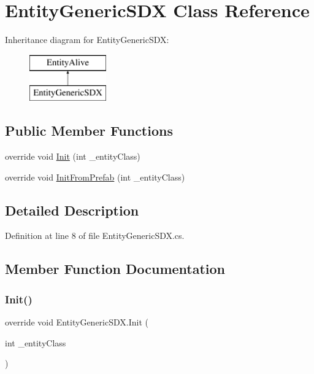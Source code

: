 \hypertarget{class_entity_generic_s_d_x}{}\section{Entity\+Generic\+S\+DX Class Reference}
\label{class_entity_generic_s_d_x}
Inheritance diagram for Entity\+Generic\+S\+DX\+:\begin{figure}[H]
\begin{center}
\leavevmode
\includegraphics[height=2.000000cm]{class_entity_generic_s_d_x}
\end{center}
\end{figure}
\subsection*{Public Member Functions}
\begin{DoxyCompactItemize}
\item 
override void \mbox{\hyperlink{class_entity_generic_s_d_x_aeb473bfc33f2d11fa6ff2774be24d6bb}{Init}} (int \+\_\+entity\+Class)
\item 
override void \mbox{\hyperlink{class_entity_generic_s_d_x_ae8b8dcd1b303f606cc1c997b47583d9a}{Init\+From\+Prefab}} (int \+\_\+entity\+Class)
\end{DoxyCompactItemize}


\subsection{Detailed Description}


Definition at line 8 of file Entity\+Generic\+S\+D\+X.\+cs.



\subsection{Member Function Documentation}
\mbox{\label{class_entity_generic_s_d_x_aeb473bfc33f2d11fa6ff2774be24d6bb}} 
\subsubsection{\texorpdfstring{Init()}{Init()}}
{\footnotesize\ttfamily override void Entity\+Generic\+S\+D\+X.\+Init (\begin{DoxyParamCaption}\item[{int}]{\+\_\+entity\+Class }\end{DoxyParamCaption})}



